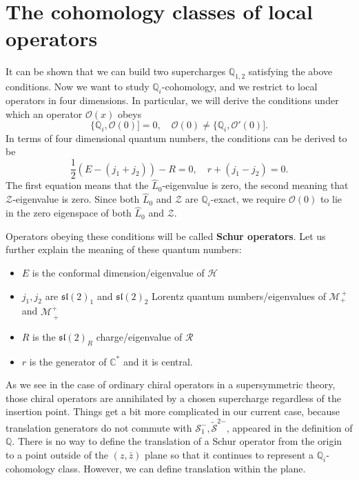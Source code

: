 \documentclass[a4paper,11pt]{article}
\begin{document}
\section{The cohomology classes of local operators}
It can be shown that we can build two supercharges $\mathbb{Q}_{1,2}$ satisfying the above conditions. Now we want to study $\mathbb{Q}_i$-cohomology, and we restrict to local operators in four dimensions. In particular, we will derive the conditions under which an operator $\mathcal{O}(x)$ obeys
\begin{equation}
    \{\mathbb{Q}_i, \mathcal{O}(0)] = 0, \quad \mathcal{O}(0) \neq \{\mathbb{Q}_i, \mathcal{O}'(0)].
\end{equation}
In terms of four dimensional quantum numbers, the conditions can be derived to be
\begin{equation}
    \frac{1}{2}(E - (j_1 + j_2)) - R = 0, \quad r + (j_1 - j_2) = 0.
\end{equation}
The first equation means that the $\widehat{L}_0$-eigenvalue is zero, the second meaning that $\mathcal{Z}$-eigenvalue is zero. Since both $\widehat{L}_0$ and $\mathcal{Z}$ are $\mathbb{Q}_i$-exact, we require $\mathcal{O}(0)$ to lie in the zero eigenspace of both $\widehat{L}_0$ and $\mathcal{Z}$.

Operators obeying these conditions will be called \textbf{Schur operators}. Let us further explain the meaning of these quantum numbers:
\begin{itemize}
    \item $E$ is the conformal dimension/eigenvalue of $\mathcal{H}$
    \item $j_1, j_2$ are $\mathfrak{sl}(2)_1$ and $\mathfrak{sl}(2)_2$ Lorentz quantum numbers/eigenvalues of $\mathcal{M}_+^{~+}$ and $\mathcal{M}^{\dot{+}}_{~\dot{+}}$
    \item $R$ is the $\mathfrak{sl}(2)_R$ charge/eigenvalue of $\mathcal{R}$
    \item $r$ is the generator of $\mathbb{C}^*$ and it is central.
\end{itemize}

As we see in the case of ordinary chiral operators in a supersymmetric theory, those chiral operators are annihilated by a chosen supercharge regardless of the insertion point. Things get a bit more complicated in our current case, because translation generators do not commute with $\mathcal{S}_1^-, \widetilde{\mathcal{S}}^{2\dot{-}}$, appeared in the definition of $\mathbb{Q}$. There is no way to define the translation of a Schur operator from the origin to a point outside of the $(z, \bar{z})$ plane so that it continues to represent a $\mathbb{Q}_i$-cohomology class. However, we can define translation within the plane.
\end{document}
